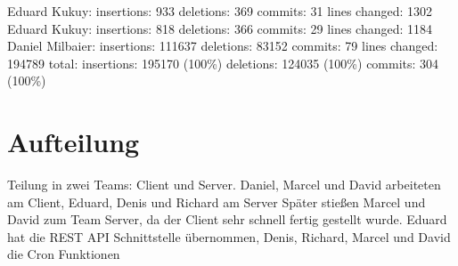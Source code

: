 	Eduard Kukuy:\newline
	  insertions:    933\newline
	  deletions:     369\newline
	  commits:       31\newline
	  lines changed: 1302\newline
\newline
	Eduard Kukuy:\newline
	  insertions:    818\newline
	  deletions:     366\newline
	  commits:       29\newline
	  lines changed: 1184\newline
\newline
	Daniel Milbaier:\newline
	  insertions:    111637\newline
	  deletions:     83152\newline
	  commits:       79\newline
	  lines changed: 194789\newline
\newline
	total:\newline
	  insertions:    195170 (100\%)\newline
	  deletions:     124035 (100\%)\newline
	  commits:       304 (100\%)\newline



    \section{Aufteilung}
    Teilung in zwei Teams: Client und Server. Daniel, Marcel und David arbeiteten am Client, Eduard, Denis und Richard am Server
    Später stießen Marcel und David zum Team Server, da der Client sehr schnell fertig gestellt wurde.
    Eduard hat die REST API Schnittstelle übernommen, Denis, Richard, Marcel und David die Cron Funktionen